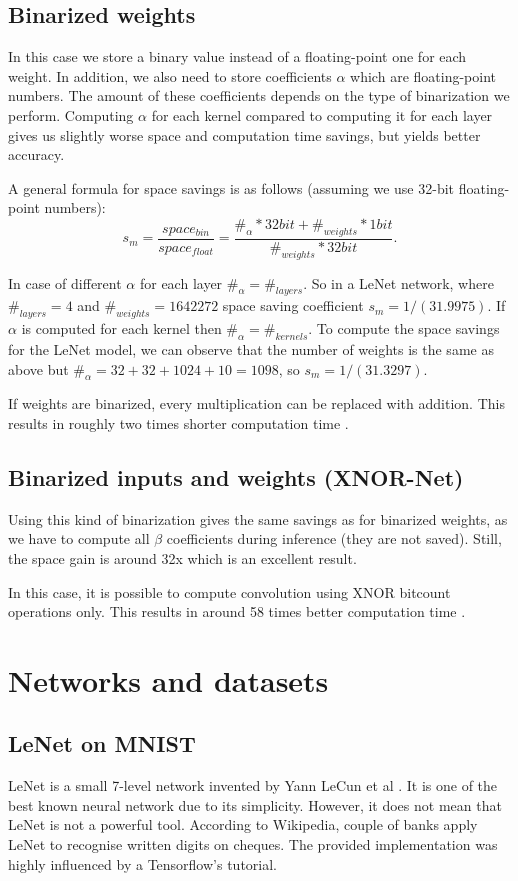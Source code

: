 \documentclass[licencjacka]{pracamgr}
\begin{document}
    \section{Binarized weights}
        In this case we store a binary value instead of a floating-point one for each weight. In addition, we also need to store coefficients $\alpha$ which are floating-point numbers. The amount of these coefficients depends on the type of binarization we perform. Computing $\alpha$ for each kernel compared to computing it for each layer gives us slightly worse space and computation time savings, but yields better accuracy.
        
        A general formula for space savings is as follows (assuming we use 32-bit floating-point numbers):
        $$s_m =  \frac{space_{bin}}{space_{float}} = \frac{\#_\alpha * 32bit + \#_{weights}*1bit}{\#_{weights} * 32bit} \text{.}$$
        
        In case of different $\alpha$ for each layer $\#_\alpha = \#_{layers}$. So in a LeNet network, where $\#_{layers} = 4$ and $\#_{weights} = 1642272$ space saving coefficient $s_m = 1/(31.9975)$. If $\alpha$ is computed for each kernel then $\#_\alpha = \#_{kernels}$. To compute the space savings for the LeNet model, we can observe that the number of weights is the same as above but $\#_\alpha = 32+32+1024+10 = 1098$, so $s_m = 1/(31.3297)$.
            
	    If weights are binarized, every multiplication can be replaced with addition. This results in roughly two times shorter computation time \cite{xnornet}.
	    
	    \section{Binarized inputs and weights (XNOR-Net)}
	    Using this kind of binarization gives the same savings as for binarized weights, as we have to compute all $\beta$ coefficients during inference (they are not saved). Still, the space gain is around 32x which is an excellent result.
	    
	    In this case, it is possible to compute convolution using XNOR bitcount operations only. This results in around 58 times better computation time \cite{xnornet}.

\chapter{Networks and datasets}
		\section{LeNet on MNIST}
 		LeNet is a small 7-level network invented by Yann LeCun et al \cite{lenet}. It is one of the best known neural network due to its simplicity. However, it does not mean that LeNet is not a powerful tool. According to Wikipedia, couple of banks apply LeNet to recognise written digits on cheques.  The provided implementation was highly influenced by a Tensorflow's tutorial. \\
\end{document}

